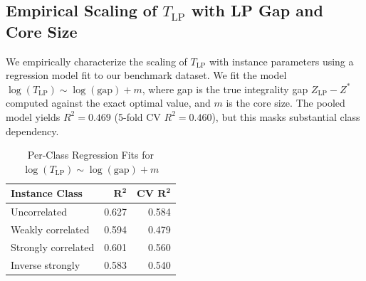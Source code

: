 \documentclass[conference]{IEEEtran}
\begin{document}
\begin{table}[htbp]
\caption{Category (b): Cutoffs Reached}
\label{tab:ortools_cat_b}
\begin{center}
\end{center}
\end{table}


\subsection{Empirical Scaling of $T_{\text{LP}}$ with LP Gap and Core Size}

We empirically characterize the scaling of $T_{\text{LP}}$ with instance parameters using a regression model fit to our benchmark dataset. We fit the model $\log(T_{\text{LP}}) \sim \log(\text{gap}) + m$, where gap is the true integrality gap $Z_{\text{LP}} - Z^*$ computed against the exact optimal value, and $m$ is the core size. The pooled model yields $R^2 = 0.469$ (5-fold CV $R^2 = 0.460$), but this masks substantial class dependency.

\begin{table}[htbp]
\caption{Per-Class Regression Fits for $\log(T_{\text{LP}}) \sim \log(\text{gap}) + m$}
\label{tab:tlp_regression}
\centering
\begin{tabular}{lrr}
\toprule
\textbf{Instance Class} & $\boldsymbol{R^2}$ & \textbf{CV $\boldsymbol{R^2}$} \\
\midrule
Uncorrelated & 0.627 & 0.584 \\
Weakly correlated & 0.594 & 0.479 \\
Strongly correlated & 0.601 & 0.560 \\
Inverse strongly & 0.583 & 0.540 \\
\bottomrule
\end{tabular}
\end{table}
\end{document}
